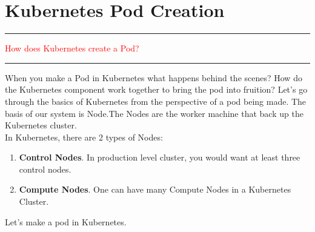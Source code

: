 \documentclass{article}
\begin{document}
\section{Kubernetes Pod Creation}
\noindent
{\color{red} \rule{\linewidth}{0.5mm}}
\textcolor{red}{How does Kubernetes create a Pod?} \\
\noindent
{\color{red} \rule{\linewidth}{0.5mm}}
When you make a Pod in Kubernetes what happens behind the scenes? How do the Kubernetes component work together to bring the pod into fruition? Let's go through the basics of Kubernetes from the perspective of a pod being made. The basis of our system is Node.The Nodes are the worker machine that back up the Kubernetes cluster. \\
In Kubernetes, there are 2 types of Nodes: 
\begin{enumerate}
    \item \textbf{Control Nodes}. In production level cluster, you would want at least three control nodes.
    \item \textbf{Compute Nodes}. One can have many Compute Nodes in a Kubernetes Cluster.
\end{enumerate}
Let's make a pod in Kubernetes.
\end{document}
